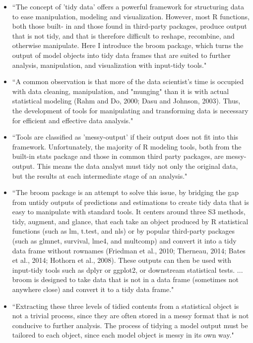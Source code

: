 \documentclass[pdftex,english,11pt,parskip=half]{scrartcl}
\begin{document}
\begin{itemize}
\item ``The concept of 'tidy data' offers a powerful framework for structuring data to ease manipulation, modeling and visualization. However, most R functions, both those built- in and those found in third-party packages, produce output that is not tidy, and that is therefore difficult to reshape, recombine, and otherwise manipulate. Here I introduce the broom package, which turns the output of model objects into tidy data frames that are suited to further analysis, manipulation, and visualization with input-tidy tools." \cite{robinson2014broom}
\item ``A common observation is that more of the data scientist’s time is occupied with data cleaning, manipulation, and "munging" than it is with actual statistical modeling (Rahm and Do, 2000; Dasu and Johnson, 2003). Thus, the development of tools for manipulating and transforming data is necessary for efficient and effective data analysis." \cite{robinson2014broom}
\item ``Tools are classified as 'messy-output' if their output does not fit into this framework. Unfortunately, the majority of R modeling tools, both from the built-in stats package and those in common third party packages, are messy-output. This means the data analyst must tidy not only the original data, but the results at each intermediate stage of an analysis." \cite{robinson2014broom}
\item ``The broom package is an attempt to solve this issue, by bridging the gap from untidy outputs of predictions and estimations to create tidy data that is easy to manipulate with standard tools. It centers around three S3 methods, tidy, augment, and glance, that each take an object produced by R statistical functions (such as lm, t.test, and nls) or by popular third-party packages (such as glmnet, survival, lme4, and multcomp) and convert it into a tidy data frame without rownames (Friedman et al., 2010; Therneau, 2014; Bates et al., 2014; Hothorn et al., 2008). These outputs can then be used with input-tidy tools such as dplyr or ggplot2, or downstream statistical tests. ... broom is designed to take data that is not in a data frame (sometimes not anywhere close) and convert it to a tidy data frame." \cite{robinson2014broom}
\item ``Extracting these three levels of tidied contents from a statistical object is not a trivial process, since they are often stored in a messy format that is not conducive to further analysis. The process of tidying a model output must be tailored to each object, since each model object is messy in its own way." \cite{robinson2014broom}

\end{itemize}
\end{document}
